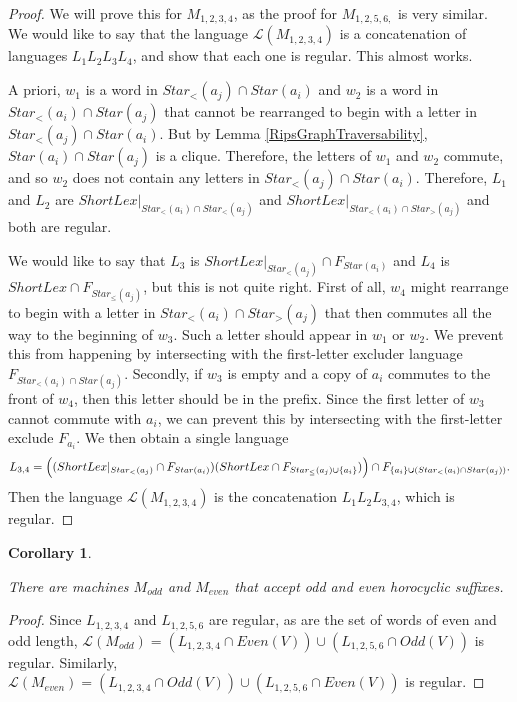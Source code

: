 \documentclass[10pt,a4paper]{amsart}
\newtheorem{corollary}[theorem]{Corollary}
\theoremstyle{definition}
\theoremstyle{remark}
\begin{document}
	\begin{proof}
		
		We will prove this for $M_{1,2,3,4}$, as the proof for $M_{1,2,5,6,}$ is very similar. We would like to say that the language $\mathscr{L}(M_{1,2,3,4})$ is a concatenation of languages $L_1L_2L_3L_4$, and show that each one is regular. This almost works.
		
		A priori, $w_1$ is a word in $Star_<(a_j)\cap Star(a_i)$ and $w_2$ is a word in $Star_<(a_i)\cap Star(a_j)$ that cannot be rearranged to begin with a letter in $Star_<(a_j)\cap Star(a_i)$. But by Lemma \ref{RipsGraphTraversability}, $Star(a_i)\cap Star(a_j)$ is a clique. Therefore, the letters of $w_1$ and $w_2$ commute, and so $w_2$ does not contain any letters in $Star_<(a_j)\cap Star(a_i)$. Therefore, $L_1$ and $L_2$ are $ShortLex|_{Star_<(a_i)\cap Star_<(a_j)}$ and $ShortLex|_{Star_<(a_i)\cap Star_>(a_j)}$ and both are regular.
		
		We would like to say that $L_3$ is $ShortLex|_{Star_<(a_j)}\cap F_{Star(a_i)}$ and $L_4$ is $ShortLex\cap F_{Star_\le(a_j)}$, but this is not quite right. First of all, $w_4$ might rearrange to begin with a letter in $Star_<(a_i)\cap Star_>(a_j)$ that then commutes all the way to the beginning of $w_3$. Such a letter should appear in $w_1$ or $w_2$. We prevent this from happening by intersecting with the first-letter excluder language $F_{Star_<(a_i)\cap Star(a_j)}$. Secondly, if $w_3$ is empty and a copy of $a_i$ commutes to the front of $w_4$, then this letter should be in the prefix. Since the first letter of $w_3$ cannot commute with $a_i$, we can prevent this by intersecting with the first-letter exclude $F_{a_i}$. We then obtain a single language 
		$$L_{3,4} = \Bigl((ShortLex|_{Star_<(a_j)}\cap F_{Star(a_i)})(ShortLex\cap F_{Star_\le(a_j)\cup \{a_i\}})\Bigr)\cap F_{\{a_i\}\cup(Star_<(a_i)\cap Star(a_j))}.$$
		Then the language $\mathscr{L}(M_{1,2,3,4})$ is the concatenation $L_1L_2L_{3,4}$, which is regular.
	\end{proof}
	
	\begin{corollary} \label{DivergenceGraphVertexFSM}
		
		There are machines $M_{odd}$ and $M_{even}$ that accept odd and even horocyclic suffixes.
		
	\end{corollary}
	
	\begin{proof}
		
		Since $L_{1,2,3,4}$ and $L_{1,2,5,6}$ are regular, as are the set of words of even and odd length, $\mathscr{L}(M_{odd})=(L_{1,2,3,4}\cap Even(V))\cup (L_{1,2,5,6}\cap Odd(V))$ is regular. Similarly, \newline $\mathscr{L}(M_{even})=(L_{1,2,3,4}\cap Odd(V))\cup (L_{1,2,5,6}\cap Even(V))$ is regular. 			
	\end{proof}
	
\end{document}

